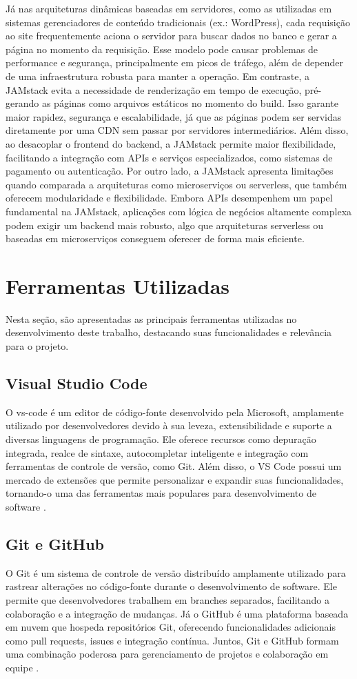 Já nas arquiteturas dinâmicas baseadas em servidores, como as utilizadas em sistemas gerenciadores de conteúdo tradicionais (ex.: WordPress), cada requisição ao site frequentemente aciona o servidor para buscar dados no banco e gerar a página no momento da requisição. Esse modelo pode causar problemas de performance e segurança, principalmente em picos de tráfego, além de depender de uma infraestrutura robusta para manter a operação.
Em contraste, a JAMstack evita a necessidade de renderização em tempo de execução, pré-gerando as páginas como arquivos estáticos no momento do build. Isso garante maior rapidez, segurança e escalabilidade, já que as páginas podem ser servidas diretamente por uma CDN sem passar por servidores intermediários. Além disso, ao desacoplar o frontend do backend, a JAMstack permite maior flexibilidade, facilitando a integração com APIs e serviços especializados, como sistemas de pagamento ou autenticação.
Por outro lado, a JAMstack apresenta limitações quando comparada a arquiteturas como microserviços ou serverless, que também oferecem modularidade e flexibilidade. Embora APIs desempenhem um papel fundamental na JAMstack, aplicações com lógica de negócios altamente complexa podem exigir um backend mais robusto, algo que arquiteturas serverless ou baseadas em microserviços conseguem oferecer de forma mais eficiente.

\section{Ferramentas Utilizadas}
Nesta seção, são apresentadas as principais ferramentas utilizadas no desenvolvimento deste trabalho, destacando suas funcionalidades e relevância para o projeto.

\subsection{Visual Studio Code}
O \gls{vs-code} é um editor de código-fonte desenvolvido pela Microsoft, amplamente utilizado por desenvolvedores devido à sua leveza, extensibilidade e suporte a diversas linguagens de programação. Ele oferece recursos como depuração integrada, realce de sintaxe, autocompletar inteligente e integração com ferramentas de controle de versão, como Git. Além disso, o VS Code possui um mercado de extensões que permite personalizar e expandir suas funcionalidades, tornando-o uma das ferramentas mais populares para desenvolvimento de software \citep{vscode}.

\subsection{Git e GitHub}
O Git é um sistema de controle de versão distribuído amplamente utilizado para rastrear alterações no código-fonte durante o desenvolvimento de software. Ele permite que desenvolvedores trabalhem em branches separados, facilitando a colaboração e a integração de mudanças. Já o GitHub é uma plataforma baseada em nuvem que hospeda repositórios Git, oferecendo funcionalidades adicionais como pull requests, issues e integração contínua. Juntos, Git e GitHub formam uma combinação poderosa para gerenciamento de projetos e colaboração em equipe \cite{git,github}.

